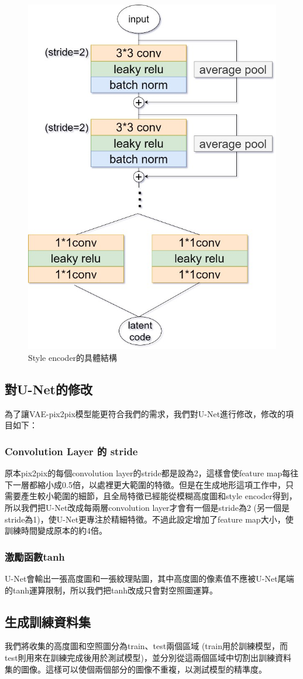\documentclass[a4paper, 12pt]{article}
\begin{document}
\begin{figure}[H]
    \centering
    \includegraphics[width=0.4\linewidth]{fig/8.jpg}
    \caption{Style encoder的具體結構}
    \label{fig:7}
\end{figure}

\subsection{對U-Net的修改}
為了讓VAE-pix2pix模型能更符合我們的需求，我們對U-Net進行修改，修改的項目如下：

\subsubsection{Convolution Layer 的 stride}
原本pix2pix的每個convolution layer的stride都是設為2，這樣會使feature map每往下一層都縮小成0.5倍，以處裡更大範圍的特徵。但是在生成地形這項工作中，只需要產生較小範圍的細節，且全局特徵已經能從模糊高度圖和style encoder得到，所以我們把U-Net改成每兩層convolution layer才會有一個是stride為2 (另一個是stride為1)，使U-Net更專注於精細特徵。不過此設定增加了feature map大小，使訓練時間變成原本的約4倍。

\subsubsection{激勵函數tanh}

U-Net會輸出一張高度圖和一張紋理貼圖，其中高度圖的像素值不應被U-Net尾端的tanh運算限制，所以我們把tanh改成只會對空照圖運算。

\subsection{生成訓練資料集}

我們將收集的高度圖和空照圖分為train、test兩個區域 (train用於訓練模型，而test則用來在訓練完成後用於測試模型)，並分別從這兩個區域中切割出訓練資料集的圖像。這樣可以使個兩個部分的圖像不重複，以測試模型的精準度。
\end{document}
